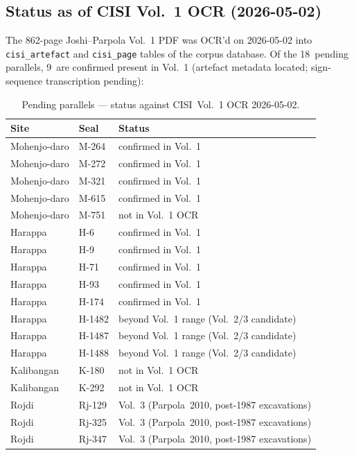\subsection{Status as of CISI Vol.~1 OCR (2026-05-02)}

The 862-page Joshi--Parpola Vol.~1 PDF was OCR'd on 2026-05-02
into \texttt{cisi\_artefact} and \texttt{cisi\_page} tables of the
corpus database. Of the 18~pending parallels, 9~are confirmed
present in Vol.~1 (artefact metadata located; sign-sequence
transcription pending):

\begin{longtable}{@{}lll@{}}
\caption{Pending parallels — status against CISI~Vol.~1 OCR
2026-05-02.}
\label{tab:pending-status}\\
\toprule
Site & Seal & Status \\
\midrule
\endfirsthead
\bottomrule
\endlastfoot
Mohenjo-daro & M-264 & confirmed in Vol.~1 \\
\midrule
Mohenjo-daro & M-272 & confirmed in Vol.~1 \\
\midrule
Mohenjo-daro & M-321 & confirmed in Vol.~1 \\
\midrule
Mohenjo-daro & M-615 & confirmed in Vol.~1 \\
\midrule
Mohenjo-daro & M-751 & not in Vol.~1 OCR \\
\midrule
Harappa & H-6   & confirmed in Vol.~1 \\
\midrule
Harappa & H-9   & confirmed in Vol.~1 \\
\midrule
Harappa & H-71  & confirmed in Vol.~1 \\
\midrule
Harappa & H-93  & confirmed in Vol.~1 \\
\midrule
Harappa & H-174 & confirmed in Vol.~1 \\
\midrule
Harappa & H-1482 & beyond Vol.~1 range (Vol.~2/3 candidate) \\
\midrule
Harappa & H-1487 & beyond Vol.~1 range (Vol.~2/3 candidate) \\
\midrule
Harappa & H-1488 & beyond Vol.~1 range (Vol.~2/3 candidate) \\
\midrule
Kalibangan & K-180 & not in Vol.~1 OCR \\
\midrule
Kalibangan & K-292 & not in Vol.~1 OCR \\
\midrule
Rojdi & Rj-129 & Vol.~3 (Parpola~2010, post-1987 excavations) \\
\midrule
Rojdi & Rj-325 & Vol.~3 (Parpola~2010, post-1987 excavations) \\
\midrule
Rojdi & Rj-347 & Vol.~3 (Parpola~2010, post-1987 excavations) \\
\end{longtable}

